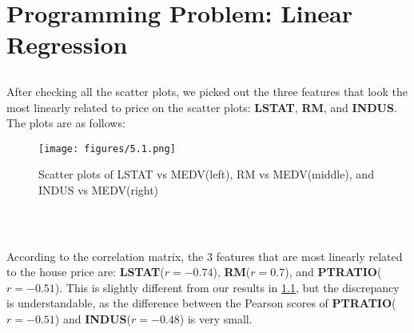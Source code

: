 \documentclass{article}
\begin{document}
    \section{Programming Problem: Linear Regression}

        \subsection{}\label{5.1}
        After checking all the scatter plots, we picked out the three features that look the most linearly related to price on the scatter plots:
        \textbf{LSTAT}, \textbf{RM}, and \textbf{INDUS}. The plots are as follows:
        \begin{figure}[hbt!]
            \centering
            \texttt{[image: figures/5.1.png]}
            \caption{Scatter plots of LSTAT vs MEDV(left), RM vs MEDV(middle), and INDUS vs MEDV(right)}
        \end{figure}\\
        
        \subsection{}
        According to the correlation matrix, the 3 features that are most linearly related to the house price are:
        \textbf{LSTAT}($r=-0.74$), \textbf{RM}($r=0.7$), and \textbf{PTRATIO}($r=-0.51$). This is slightly different from our results in \ref{5.1}, 
        but the discrepancy is understandable, as the difference between the Pearson scores of \textbf{PTRATIO}($r=-0.51$) and \textbf{INDUS}($r=-0.48$) is very small.
\end{document}
